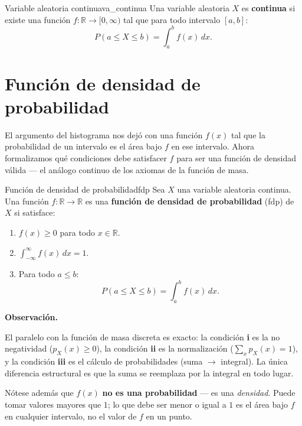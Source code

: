 \documentclass[12pt, a4paper]{book}
\newenvironment{observacion}{%
    \par\medskip\noindent\textbf{\color{azul}Observaci\'{o}n.}\enspace\itshape
}{\par\medskip}
\numberwithin{equation}{chapter}
\begin{document}
\begin{definicion}{Variable aleatoria continua}{va_continua}
	Una variable aleatoria $X$ es \textbf{continua} si existe una
	función $f: \mathbb{R} \to [0, \infty)$ tal que para todo
	intervalo $[a, b]$:
	\[
	P(a \leq X \leq b) = \int_a^b f(x)\, dx.
	\]
\end{definicion}

\section{Funci\'{o}n de densidad de probabilidad}

El argumento del histograma nos dejó con una función $f(x)$ tal que
la probabilidad de un intervalo es el área bajo $f$ en ese intervalo.
Ahora formalizamos qué condiciones debe satisfacer $f$ para ser una
función de densidad válida --- el análogo continuo de los axiomas de
la función de masa.

\begin{definicion}{Funci\'{o}n de densidad de probabilidad}{fdp}
	Sea $X$ una variable aleatoria continua. Una función
	$f: \mathbb{R} \to \mathbb{R}$ es una \textbf{función de densidad
		de probabilidad} (fdp) de $X$ si satisface:
	\begin{enumerate}[label=\textbf{\roman*)}]
		\item $f(x) \geq 0$ para todo $x \in \mathbb{R}$.
		\item $\displaystyle\int_{-\infty}^{\infty} f(x)\,dx = 1$.
		\item Para todo $a \leq b$:
		\[
		P(a \leq X \leq b) = \int_a^b f(x)\,dx.
		\]
	\end{enumerate}
\end{definicion}

\begin{observacion}
	El paralelo con la función de masa discreta es exacto: la condición
	\textbf{i} es la no negatividad ($p_X(x) \geq 0$), la condición
	\textbf{ii} es la normalización ($\sum_x p_X(x) = 1$), y la
	condición \textbf{iii} es el cálculo de probabilidades (suma
	$\to$ integral). La única diferencia estructural es que la suma
	se reemplaza por la integral en todo lugar.
	
	Nótese además que $f(x)$ \textbf{no es una probabilidad} ---
	es una \emph{densidad}. Puede tomar valores mayores que $1$; lo
	que debe ser menor o igual a $1$ es el área bajo $f$ en cualquier
	intervalo, no el valor de $f$ en un punto.
\end{observacion}
\end{document}
